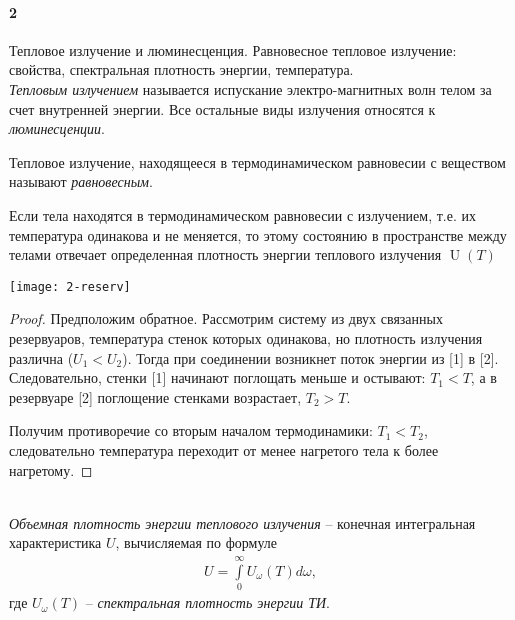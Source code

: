 



\paragraph{2}
Тепловое излучение и люминесценция. Равновесное тепловое излучение: свойства, спектральная плотность энергии, температура.\\

\textit{Тепловым излучением} называется испускание электро-магнитных волн телом за счет внутренней энергии. Все остальные виды излучения относятся к \textit{люминесценции}.

Тепловое излучение, находящееся в термодинамическом равновесии с веществом называют \textit{равновесным}.

\begin{statement}
Если тела находятся в термодинамическом равновесии с излучением, т.е. их температура одинакова и не меняется, то этому состоянию в пространстве между телами отвечает определенная плотность энергии теплового излучения $\operatorname{U}(T)$
\end{statement}
\begin{minipage}{.35\linewidth}
\texttt{[image: 2-reserv]}
\end{minipage}
\hfill
\begin{minipage}{.6\linewidth}
\begin{proof}
Предположим обратное. Рассмотрим систему из двух связанных резервуаров, температура стенок которых одинакова, но плотность излучения различна ($U_1<U_2$). Тогда при соединении возникнет поток энергии из [1] в [2]. Следовательно, стенки [1] начинают поглощать меньше и остывают: $T_1 < T$, а в резервуаре [2] поглощение стенками возрастает, $T_2 > T$.

Получим противоречие со вторым началом термодинамики: $T_1<T_2$, следовательно температура переходит от менее нагретого тела к более нагретому.
\end{proof}
\end{minipage}\\

\textit{Объемная плотность энергии теплового излучения} -- конечная интегральная характеристика $U$, вычисляемая по формуле
\begin{gather*}
U=\int\limits_{0}^{\infty}U_\omega(T)d\omega,
\end{gather*}
где $U_\omega(T)$ -- \textit{спектральная плотность энергии ТИ}.\\

